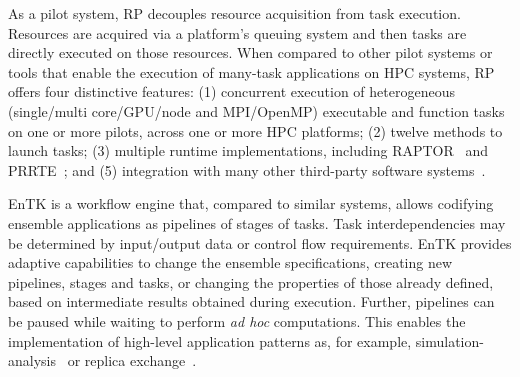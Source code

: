 \documentclass[preprint,12pt, a4paper]{elsarticle}
\begin{document}

As a pilot system, RP decouples resource acquisition from task execution.
Resources are acquired via a platform's queuing system and then tasks are
directly executed on those resources.
%
%
When compared to other pilot systems or tools that enable the execution of
many-task applications on HPC systems, RP offers four distinctive features: (1)
concurrent execution of heterogeneous (single/multi core/GPU/node and
MPI/OpenMP) executable and function tasks on one or more pilots, across one or
more HPC platforms;
(2) twelve methods to launch tasks; (3) multiple runtime implementations,
including RAPTOR~\cite{merzky2022raptor} and
PRRTE~\cite{turilli2019characterizing,titov2022radical}; and (5) integration
with many other third-party software systems~\cite{turilli2019middleware}.


EnTK is a workflow engine that, compared to similar systems, allows codifying
ensemble applications as pipelines of stages of tasks. Task interdependencies
may be determined by input/output data or control flow requirements.
%
%
EnTK provides adaptive capabilities to change the ensemble specifications,
creating new pipelines, stages and tasks, or changing the properties of those
already defined, based on intermediate results obtained during execution.
Further, pipelines can be paused while waiting to perform \textit{ad hoc}
computations. This enables the implementation of high-level application
patterns as, for example,
simulation-analysis~\cite{balasubramanian2016extasy} or replica
exchange~\cite{treikalis2016repex,mushnoori2018repex}.
\end{document}
